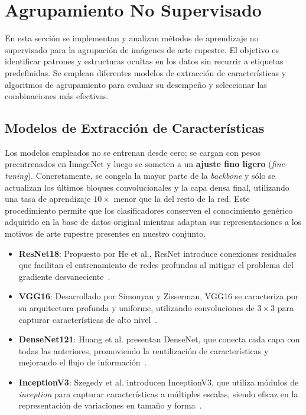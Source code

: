 \section{Agrupamiento No Supervisado}
\label{sec:unsup}

En esta sección se implementan y analizan métodos de aprendizaje no supervisado para la agrupación de imágenes de arte rupestre.
El objetivo es identificar patrones y estructuras ocultas en los datos sin recurrir a etiquetas predefinidas.
Se emplean diferentes modelos de extracción de características y algoritmos de agrupamiento para evaluar su desempeño y seleccionar las combinaciones más efectivas.

\subsection{Modelos de Extracción de Características}

Los modelos empleados no se entrenan desde cero; se cargan con pesos preentrenados en ImageNet y luego se someten a un \textbf{ajuste fino ligero} (\emph{fine-tuning}).
Concretamente, se congela la mayor parte de la \emph{backbone} y sólo se actualizan los últimos bloques convolucionales y la capa densa final, utilizando una tasa de aprendizaje \(10\times\) menor que la del resto de la red.
Este procedimiento permite que los clasificadores conserven el conocimiento genérico adquirido en la base de datos original mientras adaptan sus representaciones a los motivos de arte rupestre presentes en nuestro conjunto.

\begin{itemize}
    \item \textbf{ResNet18}: Propuesto por He et al., ResNet introduce conexiones residuales que facilitan el entrenamiento de redes profundas al mitigar el problema del gradiente desvaneciente~\cite{he2016deep}.
    \item \textbf{VGG16}: Desarrollado por Simonyan y Zisserman, VGG16 se caracteriza por su arquitectura profunda y uniforme, utilizando convoluciones de \(3 \times 3\) para capturar características de alto nivel~\cite{simonyan2014very}.
    \item \textbf{DenseNet121}: Huang et al. presentan DenseNet, que conecta cada capa con todas las anteriores, promoviendo la reutilización de características y mejorando el flujo de información~\cite{huang2017densely}.
    \item \textbf{InceptionV3}: Szegedy et al. introducen InceptionV3, que utiliza módulos de \emph{inception} para capturar características a múltiples escalas, siendo eficaz en la representación de variaciones en tamaño y forma~\cite{szegedy2016rethinking}.
\end{itemize}


